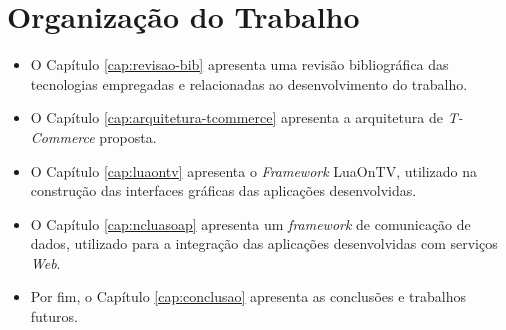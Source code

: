 \section{Organização do Trabalho}


\begin{itemize}
	\item O Capítulo \ref{cap:revisao-bib} apresenta uma revisão bibliográfica das tecnologias empregadas
e relacionadas ao desenvolvimento do trabalho.
  \item O Capítulo \ref{cap:arquitetura-tcommerce} apresenta a arquitetura de \textit{T-Commerce} proposta.
  \item O Capítulo \ref{cap:luaontv} apresenta o \textit{Framework} LuaOnTV, utilizado na construção
das interfaces gráficas das aplicações desenvolvidas.
  \item O Capítulo \ref{cap:ncluasoap} apresenta um \textit{framework} de comunicação de dados, utilizado
para a integração das aplicações desenvolvidas com serviços \textit{Web}.
  \item Por fim, o Capítulo \ref{cap:conclusao} apresenta as conclusões e trabalhos futuros.
\end{itemize}

